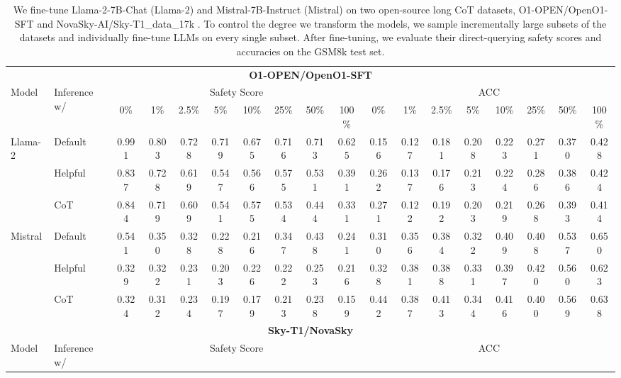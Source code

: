 \begin{table}[h]
  \centering
  \caption{We fine-tune Llama-2-7B-Chat (Llama-2) and Mistral-7B-Instruct (Mistral) on two open-source long CoT datasets, O1-OPEN/OpenO1-SFT \citep{open-o1-2025} and NovaSky-AI/Sky-T1\_data\_17k \citep{sky-t1-2025}. To control the degree we transform the models, we sample incrementally large subsets of the datasets and individually fine-tune LLMs on every single subset. After fine-tuning, we evaluate their direct-querying safety scores and accuracies on the GSM8k test set.} 
  \label{tab::complete_finetune_long_cot}
  \begin{adjustbox}{max width=1.0\textwidth}
    \begin{tabular}{ll|cccccccc|cccccccc}
      \toprule
      \multicolumn{18}{c}{\textbf{O1-OPEN/OpenO1-SFT}} \\[0.5ex]
      \cmidrule(r){1-18}
      \multirow{2}{*}{Model} & \multirow{2}{*}{Inference w/} & \multicolumn{8}{c|}{Safety Score} & \multicolumn{8}{c}{ACC} \\
      & & 0\% & 1\% & 2.5\% & 5\% & 10\% & 25\% & 50\% & 100\% & 0\% & 1\% & 2.5\% & 5\% & 10\% & 25\% & 50\% & 100\% \\
      \midrule
      \multirow{3}{*}{Llama-2} 
      & Default & 0.991 & 0.803 & 0.728 & 0.719 & 0.675 & 0.716 & 0.713 & 0.625 & 0.156 & 0.127 & 0.181 & 0.208 & 0.223 & 0.271 & 0.370 & 0.428 \\
      & Helpful & 0.837 & 0.728 & 0.619 & 0.547 & 0.566 & 0.575 & 0.531 & 0.391 & 0.262 & 0.137 & 0.176 & 0.213 & 0.224 & 0.286 & 0.386 & 0.424 \\
      & CoT     & 0.844 & 0.719 & 0.609 & 0.541 & 0.575 & 0.534 & 0.444 & 0.331 & 0.271 & 0.122 & 0.192 & 0.203 & 0.219 & 0.268 & 0.393 & 0.414 \\
      \midrule
      \multirow{3}{*}{Mistral} 
      & Default & 0.541 & 0.350 & 0.328 & 0.228 & 0.216 & 0.347 & 0.438 & 0.241 & 0.310 & 0.356 & 0.384 & 0.322 & 0.409 & 0.408 & 0.537 & 0.650 \\
      & Helpful & 0.329 & 0.322 & 0.231 & 0.203 & 0.226 & 0.222 & 0.253 & 0.216 & 0.328 & 0.381 & 0.388 & 0.331 & 0.397 & 0.420 & 0.560 & 0.623 \\
      & CoT     & 0.324 & 0.312 & 0.234 & 0.197 & 0.179 & 0.213 & 0.238 & 0.159 & 0.442 & 0.387 & 0.413 & 0.344 & 0.416 & 0.400 & 0.569 & 0.638 \\
      \midrule
      \multicolumn{18}{c}{\textbf{Sky-T1/NovaSky}} \\[0.5ex]
      \cmidrule(r){1-18}
      \multirow{2}{*}{Model} & \multirow{2}{*}{Inference w/} & \multicolumn{8}{c|}{Safety Score} & \multicolumn{8}{c}{ACC} \\

\end{tabular}
\end{adjustbox}
\end{table}
